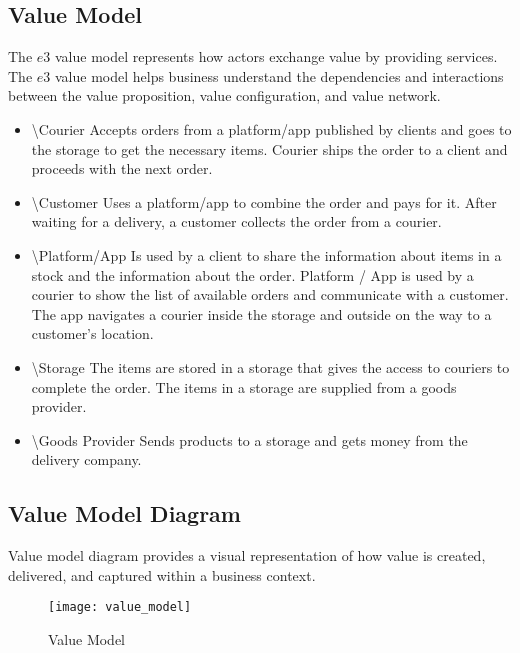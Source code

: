 \subsection{Value Model}

The $e3$ value model represents how actors exchange value by providing services.
The $e3$ value model helps business understand the dependencies and interactions between
the value proposition, value configuration, and value network.

\begin{itemize}
    \item \textbackslash Courier Accepts orders from a platform/app published by clients and goes to the storage to get the necessary items. Courier ships the order to a client and proceeds with the next order.
    \item \textbackslash Customer Uses a platform/app to combine the order and pays for it. After waiting for a delivery, a customer collects the order from a courier.
    \item \textbackslash Platform/App Is used by a client to share the information about items in a stock and the information about the order. Platform / App is used by a courier to show the list of available orders and communicate with a customer. The app navigates a courier inside the storage and outside on the way to a customer’s location.
    \item \textbackslash Storage The items are stored in a storage that gives the access to couriers to complete the order. The items in a storage are supplied from a goods provider.
    \item \textbackslash Goods Provider Sends products to a storage and gets money from the delivery company.
\end{itemize}

\subsection{Value Model Diagram}

Value model diagram provides a visual representation of how value is created, delivered, and captured within a business context.

\begin{figure}[H]
	\centering
	\texttt{[image: value\_model]}
	\caption{Value Model}
	\label{fig:value_model}
\end{figure}
